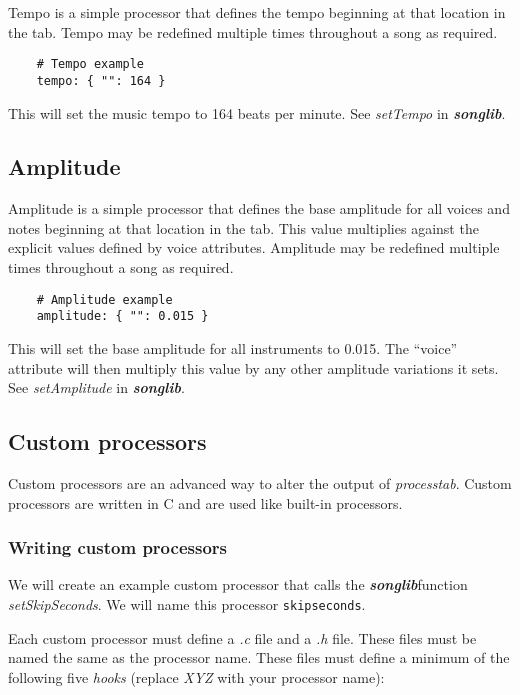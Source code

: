 \documentclass{article}
\newcommand\songlib {{\it\bf songlib}}
\begin{document}
Tempo is a simple processor that defines the tempo beginning at that location
in the tab.  Tempo may be redefined multiple times throughout a song as
required.

\begin{verbatim}
    # Tempo example
    tempo: { "": 164 }
\end{verbatim}

This will set the music tempo to 164 beats per minute.  See {\it setTempo} in
\songlib.

\subsection*{Amplitude}

Amplitude is a simple processor that defines the base amplitude for all voices
and notes beginning at that location in the tab.  This value multiplies against
the explicit values defined by voice attributes.  Amplitude may be redefined
multiple times throughout a song as required.

\begin{verbatim}
    # Amplitude example
    amplitude: { "": 0.015 }
\end{verbatim}

This will set the base amplitude for all instruments to 0.015.  The ``voice''
attribute will then multiply this value by any other amplitude variations it
sets.  See {\it setAmplitude} in \songlib.

\subsection*{Custom processors}

Custom processors are an advanced way to alter the output of {\it processtab}.
Custom processors are written in C and are used like built-in processors.

\subsubsection*{Writing custom processors}

We will create an example custom processor that calls the \songlib function {\it
setSkipSeconds}.  We will name this processor \verb!skipseconds!.

Each custom processor must define a {\it .c} file and a {\it .h} file.  These
files must be named the same as the processor name.  These files must define a
minimum of the following five {\it hooks} (replace {\it XYZ} with your processor
name):
\end{document}
